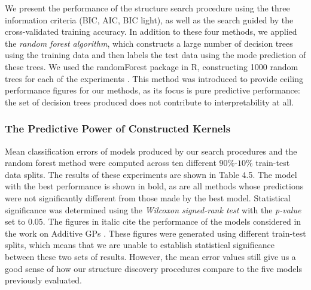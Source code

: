 \documentclass[a4paper,12pt ]{report}
\renewcommand{\GP}{{GP}}
\begin{document}



We present the performance of the structure search procedure using the three information criteria (BIC, AIC, BIC light), as well as the search guided by the cross-validated training accuracy. In addition to these four methods, we applied the \emph{random forest algorithm}, which constructs a large number of decision trees using the training data and then labels the test data using the mode prediction of these trees. We used the randomForest package in R, constructing 1000 random trees for each of the experiments \cite{randomforest}. This method was introduced to provide {ceiling} performance figures for our methods, as its focus is pure predictive performance: the set of decision trees produced does not contribute to interpretability at all.

\subsubsection*{The Predictive Power of Constructed Kernels }

Mean classification errors of models produced by our search procedures and the random forest method were computed across ten different $90\%$-$10\%$ train-test data splits. The results of these experiments are shown in Table 4.5. The model with the best performance is shown in bold, as are all methods whose predictions were not significantly different from those made by the best model. Statistical significance was determined using the \emph{Wilcoxon signed-rank test} with the \emph{p-value} set to $0.05$.
The figures in italic cite the performance of the models considered in the work on Additive GPs \cite{duvenaud2011additive11}. These figures were generated using different train-test splits, which means that we are unable to establish statistical significance between these two sets of results. However, the mean error values still give us a good sense of how our structure discovery procedures compare to the five models previously evaluated.



\end{document}
